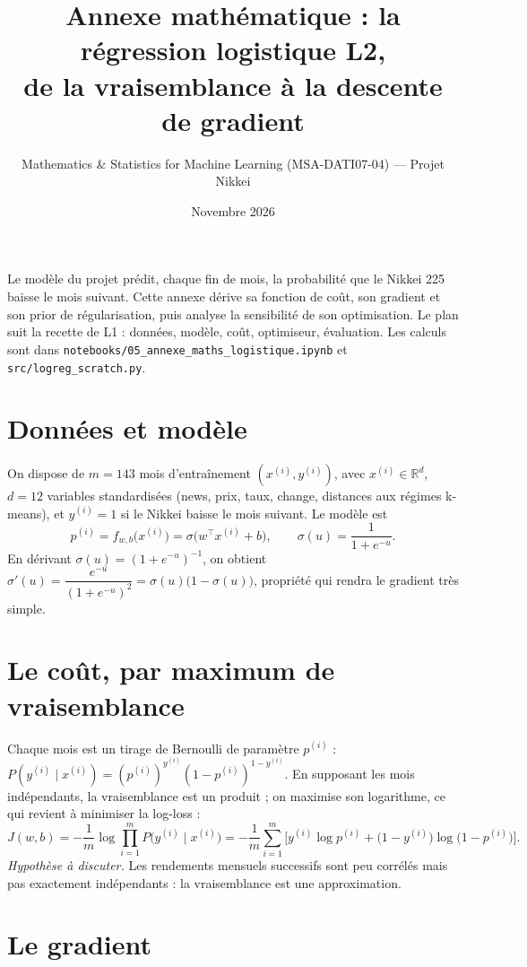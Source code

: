 \documentclass[11pt,a4paper]{article}
\title{\textbf{Annexe mathématique : la régression logistique L2,\\ de la vraisemblance à la descente de gradient}}
\author{Mathematics \& Statistics for Machine Learning (MSA-DATI07-04) --- Projet Nikkei}
\date{Novembre 2026}
\begin{document}
\maketitle

\noindent Le modèle du projet prédit, chaque fin de mois, la probabilité que le Nikkei 225 baisse le mois suivant. Cette
annexe dérive sa fonction de coût, son gradient et son prior de régularisation, puis analyse la sensibilité de son
optimisation. Le plan suit la recette de L1 : données, modèle, coût, optimiseur, évaluation. Les calculs sont dans
\texttt{notebooks/05\_annexe\_maths\_logistique.ipynb} et \texttt{src/logreg\_scratch.py}.

\section{Données et modèle}

On dispose de $m=143$ mois d'entraînement $(x^{(i)},y^{(i)})$, avec $x^{(i)}\in\mathbb R^{d}$, $d=12$ variables
standardisées (news, prix, taux, change, distances aux régimes k-means), et $y^{(i)}=1$ si le Nikkei baisse le mois
suivant. Le modèle est
\[
p^{(i)}=f_{w,b}\big(x^{(i)}\big)=\sigma\big(w^\top x^{(i)}+b\big),\qquad \sigma(u)=\frac{1}{1+e^{-u}} .
\]
En dérivant $\sigma(u)=(1+e^{-u})^{-1}$, on obtient
$\sigma'(u)=\dfrac{e^{-u}}{(1+e^{-u})^2}=\sigma(u)\big(1-\sigma(u)\big)$, propriété qui rendra le gradient très simple.

\section{Le coût, par maximum de vraisemblance}

Chaque mois est un tirage de Bernoulli de paramètre $p^{(i)}$ : $P(y^{(i)}\mid x^{(i)})=(p^{(i)})^{y^{(i)}}(1-p^{(i)})^{1-y^{(i)}}$.
En supposant les mois indépendants, la vraisemblance est un produit ; on maximise son logarithme, ce qui revient à
minimiser la log-loss :
\[
J(w,b)=-\frac1m\log\prod_{i=1}^{m}P\big(y^{(i)}\mid x^{(i)}\big)
=-\frac1m\sum_{i=1}^{m}\Big[y^{(i)}\log p^{(i)}+\big(1-y^{(i)}\big)\log\big(1-p^{(i)}\big)\Big].
\]
\emph{Hypothèse à discuter.} Les rendements mensuels successifs sont peu corrélés mais pas exactement indépendants :
la vraisemblance est une approximation.

\section{Le gradient}
\end{document}
